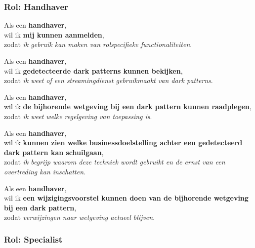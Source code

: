 \subsubsection{Rol: Handhaver}

\vspace{1em}

Als een \textbf{handhaver}, \\
wil ik \textbf{mij kunnen aanmelden}, \\
zodat \textit{ik gebruik kan maken van rolspecifieke functionaliteiten}.

\vspace{1em}

Als een \textbf{handhaver}, \\
wil ik \textbf{gedetecteerde dark patterns kunnen bekijken}, \\
zodat \textit{ik weet of een streamingdienst gebruikmaakt van dark patterns}.

\newpage

Als een \textbf{handhaver}, \\
wil ik \textbf{de bijhorende wetgeving bij een dark pattern kunnen raadplegen}, \\
zodat \textit{ik weet welke regelgeving van toepassing is}.

\vspace{1em}

Als een \textbf{handhaver}, \\
wil ik \textbf{kunnen zien welke businessdoelstelling achter een gedetecteerd dark pattern kan schuilgaan}, \\
zodat \textit{ik begrijp waarom deze techniek wordt gebruikt en de ernst van een overtreding kan inschatten}.

\vspace{1em}

Als een \textbf{handhaver}, \\
wil ik \textbf{een wijzigingsvoorstel kunnen doen van de bijhorende wetgeving bij een dark pattern}, \\
zodat \textit{verwijzingen naar wetgeving actueel blijven}.

\vspace{1.5em}

\subsubsection{Rol: Specialist}

\vspace{1em}

